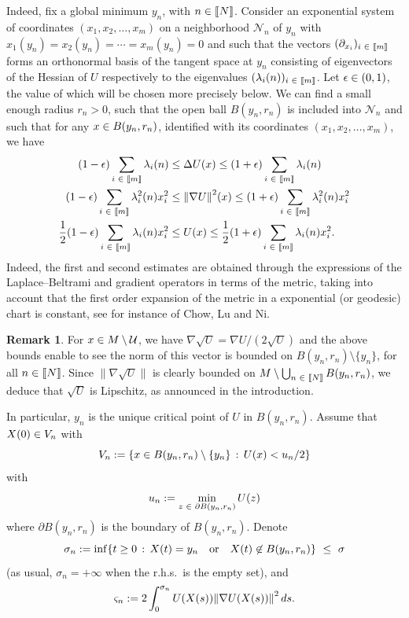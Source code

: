 \documentclass[10pt]{amsart}
\theoremstyle{definition}\newtheorem{defi}[theo]{Definition}\newtheorem{rema}[theo]{Remark}\newtheorem{exam}[theo]{Example}\newtheorem{exem}[theo]{Example}\newtheorem{nota}[theo]{Notation}
\newcommand{\f}[2]{\frac{#1}{#2}}
\newcommand{\cN}{\mathcal{N}}
\newcommand{\cU}{\mathcal{U}}
\newcommand{\iy}{\infty}
\newcommand{\na}{\nabla}
\newcommand{\pa}{\partial}
\newcommand{\tr}{\Delta}
\let\originalleft\left
\let\originalright\right
\renewcommand{\left}{\mathopen{}\mathclose\bgroup\originalleft}
\renewcommand{\right}{\aftergroup\egroup\originalright}
\let\oldin\in
\renewcommand{\in}{\mathchoice{\oldin}{\oldin}{\,\oldin\,}{\,\oldin\,}}
\newcommand{\llbracket}{\mathopen{[\mkern -2.7mu[}}
\newcommand{\rrbracket}{\mathclose{]\mkern -2.7mu]}}
\newcommand{\lin}{\llbracket}
\newcommand{\rin}{\rrbracket}
\begin{document}
Indeed, fix a global minimum $y_n$, with $n\in\lin N\rin$. Consider an exponential system of coordinates $(x_1,x_2,\dots, x_m)$ on a neighborhood $\cN_n$ of $y_n$ with $x_1(y_n)=x_2(y_n)=\cdots =x_m(y_n)=0$ and such that the vectors $(\pa_{x_i})_{i\in\lin m\rin}$ forms an orthonormal basis of the tangent space at $y_n$ consisting of eigenvectors of the Hessian of $U$ respectively to the eigenvalues $(\lambda_i(n))_{i\in\lin m\rin}$. Let $\epsilon\in(0,1)$, the value of which will be chosen more precisely below. We can find a small enough radius $r_n>0$, such that the open ball $B(y_n,r_n)$ is included into $\cN_n$ and such that for any $x\in B(y_n,r_n)$, identified with its coordinates $(x_1,x_2,\dots, x_m)$, we have
\begin{align}
(1-\epsilon)\sum_{i\in\lin m\rin}\lambda_i(n)  &\leq \tr U(x) \leq (1+\epsilon) \sum_{i\in\lin m\rin}\lambda_i(n)
\label{app1}
\\
(1-\epsilon)\sum_{i\in\lin m\rin}\lambda_i^2(n)x_i^2  &\leq \left\|\na U\right\|^2(x) \leq (1+\epsilon) \sum_{i\in\lin m\rin}\lambda_i^2(n)x_i^2
\label{app2}
\\
\f12(1-\epsilon)\sum_{i\in\lin m\rin}\lambda_i(n)x_i^2 &\leq U(x) \leq \f12(1+\epsilon)\sum_{i\in\lin m\rin}\lambda_i(n)x_i^2.\label{app3}
\end{align}
Indeed, the first and second estimates are obtained through the expressions of the Laplace--Beltrami and gradient operators in terms of the metric, taking into account that the first order expansion of the metric in a exponential (or geodesic) chart is constant, see for instance \cite[Section~10.1, p.~58]{zbMATH05081815} of Chow, Lu and Ni.



\begin{rema} \label{Lipschitz}
For $x\in M\setminus\cU$, we have $\na\sqrt{U}=\na U/(2\sqrt{U})$ and the above bounds enable to see the norm of this vector is bounded on $B(y_n,r_n)\setminus\{y_n\}$, for all $n\in\lin N\rin$. Since $\|\na\sqrt{U}\|$ is clearly bounded on $M\setminus\bigcup_{n\in\lin N\rin} B(y_n,r_n)$, we deduce that $\sqrt{U}$ is Lipschitz, as announced in the introduction.
\end{rema}

In particular, $y_n$ is the unique critical point of $U$ in $B(y_n,r_n)$. Assume that $X(0)\in V_n$ with
\begin{equation}\label{Vn}
V_n := \left\{x\in B(y_n,r_n)\setminus\{y_n\}\,:\, U(x)<u_n/2\right\}
\end{equation}
with
\begin{equation}\label{cnn}
u_n := \min_{z\in \pa B(y_n,r_n)}U(z)
\end{equation}
where $\pa B(y_n,r_n)$ is the boundary of $B(y_n,r_n)$. Denote
\begin{equation}\label{sn}
\sigma_n := \inf\{t\geq 0\,:\, X(t)=y_n\quad\text{or}\quad X(t)\not\in B(y_n,r_n)\}\ \leq \ \sigma
\end{equation}
(as usual, $\sigma_n=+\iy$ when the r.h.s.\ is the empty set), and
\begin{equation*}
\varsigma_n := 2\int_0^{\sigma_n} U(X(s))\left\| \na U(X(s))\right\|^2\, ds.
\end{equation*}
\end{document}

